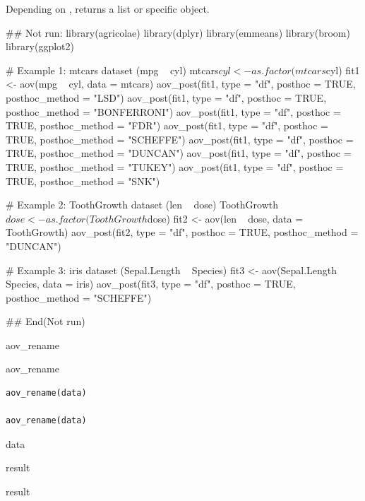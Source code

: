 \documentclass[a4paper]{book}
\begin{document}
%
\begin{Value}
Depending on , returns a list or specific object.
\end{Value}
%
\begin{Examples}
\begin{ExampleCode}
\#\# Not run: 
library(agricolae)
library(dplyr)
library(emmeans)
library(broom)
library(ggplot2)

# Example 1: mtcars dataset (mpg ~ cyl)
mtcars$cyl <- as.factor(mtcars$cyl)
fit1 <- aov(mpg ~ cyl, data = mtcars)
aov_post(fit1, type = "df", posthoc = TRUE, posthoc_method = "LSD")
aov_post(fit1, type = "df", posthoc = TRUE, posthoc_method = "BONFERRONI")
aov_post(fit1, type = "df", posthoc = TRUE, posthoc_method = "FDR")
aov_post(fit1, type = "df", posthoc = TRUE, posthoc_method = "SCHEFFE")
aov_post(fit1, type = "df", posthoc = TRUE, posthoc_method = "DUNCAN")
aov_post(fit1, type = "df", posthoc = TRUE, posthoc_method = "TUKEY")
aov_post(fit1, type = "df", posthoc = TRUE, posthoc_method = "SNK")

# Example 2: ToothGrowth dataset (len ~ dose)
ToothGrowth$dose <- as.factor(ToothGrowth$dose)
fit2 <- aov(len ~ dose, data = ToothGrowth)
aov_post(fit2, type = "df", posthoc = TRUE, posthoc_method = "DUNCAN")

# Example 3: iris dataset (Sepal.Length ~ Species)
fit3 <- aov(Sepal.Length ~ Species, data = iris)
aov_post(fit3, type = "df", posthoc = TRUE, posthoc_method = "SCHEFFE")

## End(Not run)
\end{ExampleCode}
\end{Examples}
%
\begin{Description}
aov\_rename

aov\_rename
\end{Description}
%
\begin{Usage}
\begin{verbatim}
aov_rename(data)

aov_rename(data)
\end{verbatim}
\end{Usage}
%
\begin{Arguments}
\begin{ldescription}
\item[\code{data}] data
\end{ldescription}
\end{Arguments}
%
\begin{Value}
result

result
\end{Value}
\end{document}
